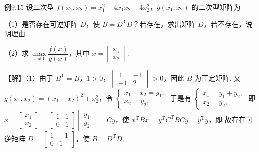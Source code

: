 \begin{fcard}{例9.15}
设二次型 $f(x_1,x_2)=x_1^2-4x_1x_2+4x_2^2$，$g(x_1,x_2)$ 的二次型矩阵为

（1）是否存在可逆矩阵 $D$，使 $B=D^{\mathrm{T}}D$？若存在，求出矩阵 $D$，若不存在，说明理由.

（2）求 $\max\limits_{x\ne0}\dfrac{f(x)}{g(x)}$，其中 $x=\begin{bmatrix}x_1\\x_2\end{bmatrix}$.

【解】（1）由于 $B^{\mathrm{T}}=B$，$1>0$，$\begin{vmatrix}1&-1\\-1&2\end{vmatrix}>0$，因此 $B$ 为正定矩阵. 又 $g(x_1,x_2)=(x_1-x_2)^2+x_2^2$，令
$\begin{cases}x_1-x_2=y_1,\\x_2=y_2,\end{cases}$ 于是有 $\begin{cases}x_1=y_1+y_2,\\x_2=y_2,\end{cases}$ 即 $x=\begin{bmatrix}x_1\\x_2\end{bmatrix}=\begin{bmatrix}1&1\\0&1\end{bmatrix}\begin{bmatrix}y_1\\y_2\end{bmatrix}=Cy$，使 $x^{\mathrm{T}}Bx=y^{\mathrm{T}}C^{\mathrm{T}}BCy=y^{\mathrm{T}}y$，即
故存在可逆矩阵 $D=\begin{bmatrix}1&-1\\0&1\end{bmatrix}$，使 $B=D^{\mathrm{T}}D$.


\end{fcard}
